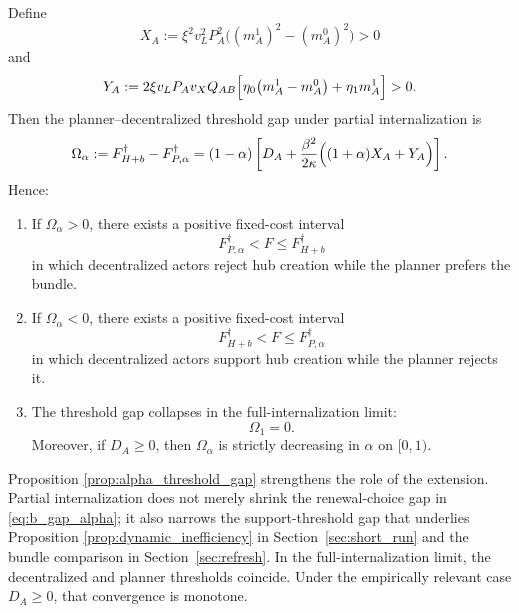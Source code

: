 \begin{proposition}
\label{prop:alpha_threshold_gap}
Define
\begin{equation}
X_A:=\xi^2 v_L^2 P_A^2\bigl((m_A^1)^2-(m_A^0)^2\bigr)>0
\label{eq:XA}
\end{equation}
and
\begin{equation}
Y_A:=2\xi v_LP_A v_XQ_{AB}\Bigl[\eta_0\bigl(m_A^1-m_A^0\bigr)+\eta_1 m_A^1\Bigr]>0.
\label{eq:YA}
\end{equation}
Then the planner--decentralized threshold gap under partial internalization is
\begin{equation}
\Omega_{\alpha}
:=
F_{H+b}^{\dagger}-F_{P,\alpha}^{\dagger}
=
(1-\alpha)
\left[
D_A+\frac{\beta^2}{2\kappa}\Bigl((1+\alpha)X_A+Y_A\Bigr)
\right].
\label{eq:Omega_alpha}
\end{equation}
Hence:
\begin{enumerate}[leftmargin=2em]
    \item If $\Omega_{\alpha}>0$, there exists a positive fixed-cost interval
    \begin{equation}
    F_{P,\alpha}^{\dagger}<F\le F_{H+b}^{\dagger}
    \label{eq:alpha_under_support_interval}
    \end{equation}
    in which decentralized actors reject hub creation while the planner prefers the bundle.

    \item If $\Omega_{\alpha}<0$, there exists a positive fixed-cost interval
    \begin{equation}
    F_{H+b}^{\dagger}<F\le F_{P,\alpha}^{\dagger}
    \label{eq:alpha_over_support_interval}
    \end{equation}
    in which decentralized actors support hub creation while the planner rejects it.

    \item The threshold gap collapses in the full-internalization limit:
    \begin{equation}
    \Omega_1=0.
    \label{eq:Omega_one}
    \end{equation}
    Moreover, if $D_A\ge 0$, then $\Omega_{\alpha}$ is strictly decreasing in $\alpha$ on $[0,1)$.
\end{enumerate}
\end{proposition}

Proposition \ref{prop:alpha_threshold_gap} strengthens the role of the extension. Partial internalization does not merely shrink the renewal-choice gap in \eqref{eq:b_gap_alpha}; it also narrows the support-threshold gap that underlies Proposition \ref{prop:dynamic_inefficiency} in Section~\ref{sec:short_run} and the bundle comparison in Section~\ref{sec:refresh}. In the full-internalization limit, the decentralized and planner thresholds coincide. Under the empirically relevant case $D_A\ge 0$, that convergence is monotone.

